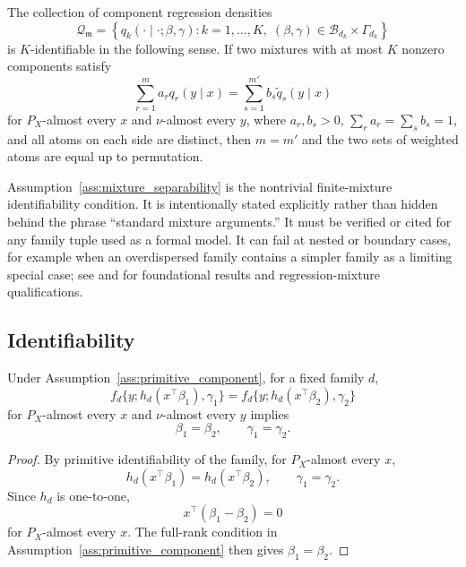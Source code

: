 \begin{assumption}
\label{ass:mixture_separability}
The collection of component regression densities
\[
    \mathcal Q_{\mathfrak m}
    =
    \left\{
    q_k(\cdot\mid\cdot;\beta,\gamma):
    k=1,\ldots,K,\;(\beta,\gamma)\in\mathcal B_{d_k}\times\Gamma_{d_k}
    \right\}
\]
is \(K\)-identifiable in the following sense.  If two mixtures with at most
\(K\) nonzero components satisfy
\[
    \sum_{r=1}^{m} a_r q_r(y\mid x)
    =
    \sum_{s=1}^{m'} b_s \tilde q_s(y\mid x)
\]
for \(P_X\)-almost every \(x\) and \(\nu\)-almost every \(y\), where
\(a_r,b_s>0\), \(\sum_r a_r=\sum_s b_s=1\), and all atoms on each side are
distinct, then \(m=m'\) and the two sets of weighted atoms are equal up to
permutation.
\end{assumption}

\begin{remark}
Assumption~\ref{ass:mixture_separability} is the nontrivial finite-mixture
identifiability condition.  It is intentionally stated explicitly rather than
hidden behind the phrase ``standard mixture arguments.''  It must be verified
or cited for any family tuple used as a formal model.  It can fail at nested or
boundary cases, for example when an overdispersed family contains a simpler
family as a limiting special case; see \citet{teicher1963identifiability} and
\citet{hennig2000identifiability} for foundational results and regression-mixture
qualifications.
\end{remark}

\subsection{Identifiability}
\label{sec:identifiability}

\begin{lemma}
\label{lem:component_ident}
Under Assumption~\ref{ass:primitive_component}, for a fixed family \(d\),
\[
    f_d\{y;h_d(x^\top\beta_1),\gamma_1\}
    =
    f_d\{y;h_d(x^\top\beta_2),\gamma_2\}
\]
for \(P_X\)-almost every \(x\) and \(\nu\)-almost every \(y\) implies
\[
    \beta_1=\beta_2,
    \qquad
    \gamma_1=\gamma_2.
\]
\end{lemma}

\begin{proof}
By primitive identifiability of the family, for \(P_X\)-almost every \(x\),
\[
    h_d(x^\top\beta_1)=h_d(x^\top\beta_2),
    \qquad
    \gamma_1=\gamma_2.
\]
Since \(h_d\) is one-to-one,
\[
    x^\top(\beta_1-\beta_2)=0
\]
for \(P_X\)-almost every \(x\).  The full-rank condition in
Assumption~\ref{ass:primitive_component} then gives \(\beta_1=\beta_2\).
\end{proof}

